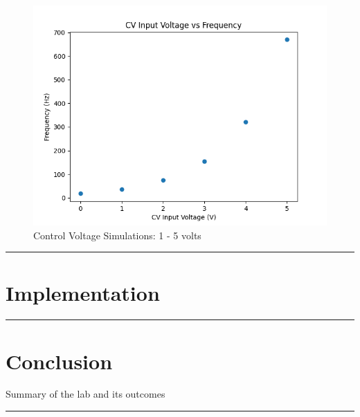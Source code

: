 \documentclass{article}
\begin{document}
\begin{figure}[H]
  \centering
  \includegraphics[width=.7\linewidth]{png/Figure_3.png}
  \caption{Control Voltage Simulations: 1 - 5 volts}
\end{figure}

\vspace{5mm}
\hrule

\section*{\textcolor{mycolor}{Implementation}}
\vspace{5mm}
\hrule

\section*{\textcolor{mycolor}{Conclusion}}
Summary of the lab and its outcomes
\vspace{5mm}
\hrule
\end{document}
